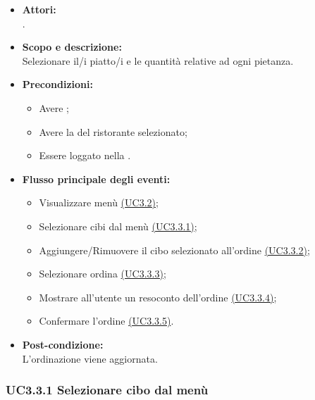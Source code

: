 \begin{itemize}
	\item \textbf{Attori:}
	\\.
	\item \textbf{Scopo e descrizione:} 
	\\Selezionare il/i piatto/i e le quantità relative ad ogni pietanza.
	\item \textbf{Precondizioni:}
	\begin{itemize}
		\item Avere ;
		\item Avere la  del ristorante selezionato;
		\item Essere loggato nella .
	\end{itemize}
	\item \textbf{Flusso principale degli eventi:}
	\begin{itemize}
		\item Visualizzare menù \hyperref[UC3.2]{(UC3.2)};
		\item Selezionare cibi dal menù \hyperref[UC3.3.1]{(UC3.3.1)};
		\item Aggiungere/Rimuovere il cibo selezionato all'ordine \hyperref[UC3.3.2]{(UC3.3.2)};
		\item Selezionare ordina \hyperref[UC3.3.3]{(UC3.3.3)};
		\item Mostrare all'utente un resoconto dell'ordine \hyperref[UC3.3.4]{(UC3.3.4)};
		\item Confermare l'ordine \hyperref[UC3.3.5]{(UC3.3.5)}.
	\end{itemize}
	\item \textbf{Post-condizione:}
	\\L'ordinazione viene aggiornata.
\end{itemize}

\subsubsection{UC3.3.1 Selezionare cibo dal menù} \label{UC3.3.1}

